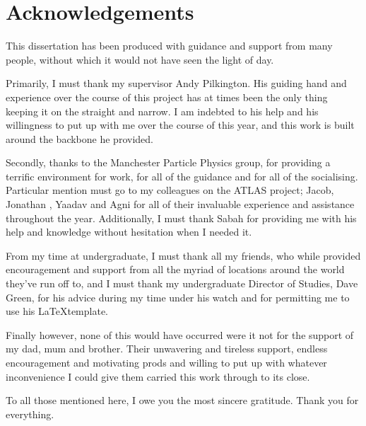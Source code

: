\chapter*{Acknowledgements}


This dissertation has been produced with guidance and support from many people, without which it would not have seen the light of day.

Primarily, I must thank my supervisor Andy Pilkington. His guiding hand and experience over the course of this project has at times been the only thing keeping it on the straight and narrow. I am indebted to his help and his willingness to put up with me over the course of this year, and this work is built around the backbone he provided.

Secondly, thanks to the Manchester Particle Physics group, for providing a terrific environment for work, for all of the guidance and for all of the socialising. Particular mention must go to my colleagues on the ATLAS project; Jacob, Jonathan
, Yaadav and Agni for all of their invaluable experience and assistance throughout the year. Additionally, I must thank Sabah for providing me with his help and knowledge without hesitation when I needed it.

From my time at undergraduate, I must thank all my friends, who while provided encouragement and support from all the myriad of locations around the world they've run off to, and I must thank my undergraduate Director of Studies, Dave Green, for his advice during my time under his watch and for permitting me to use his \LaTeX template.

Finally however, none of this would have occurred were it not for the support of my dad, mum and brother. Their unwavering and tireless support, endless encouragement and motivating prods and willing to put up with whatever inconvenience I could give them carried this work through to its close.

To all those mentioned here, I owe you the most sincere gratitude. Thank you for everything.
\cleardoublepage

\endinput
